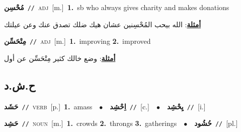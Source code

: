 \documentclass[10pt,a4paper,twoside]{article} %
\begin{document}
\begin{multicols}{2}
{\setlength\topsep{0pt}\textbf{\foreignlanguage{arabic}{مُحْسِن}}\ {\color{gray}\texttt{//}\color{black}}\ \textsc{adj}\ [m.]\ \textbf{1.}~sb who always gives charity and makes donations\  \begin{flushright}\color{gray}\foreignlanguage{arabic}{\textbf{\underline{\foreignlanguage{arabic}{أمثلة}}}: الله بيحب المُحْسِنين عشان هيك ضلك تصدق عنك وعن عيلتك}\end{flushright}\color{black}} \vspace{2mm}

{\setlength\topsep{0pt}\textbf{\foreignlanguage{arabic}{مِتْحَسِّن}}\ {\color{gray}\texttt{//}\color{black}}\ \textsc{adj}\ [m.]\ \textbf{1.}~improving  \textbf{2.}~improved\  \begin{flushright}\color{gray}\foreignlanguage{arabic}{\textbf{\underline{\foreignlanguage{arabic}{أمثلة}}}: وضع خالك كثير مِتْحَسِّن عن أول}\end{flushright}\color{black}} \vspace{2mm}

\vspace{-3mm}
\subsection*{\color{blue}\foreignlanguage{arabic}{ح.ش.د}\color{blue}{}} 

{\setlength\topsep{0pt}\textbf{\foreignlanguage{arabic}{حَشَد}}\ {\color{gray}\texttt{//}\color{black}}\ \textsc{verb}\ [p.]\ \textbf{1.}~amass\ \ $\bullet$\ \ \setlength\topsep{0pt}\textbf{\foreignlanguage{arabic}{اِحْشِد}}\ {\color{gray}\texttt{//}\color{black}}\ [c.]\ \ $\bullet$\ \ \setlength\topsep{0pt}\textbf{\foreignlanguage{arabic}{يِحْشِد}}\ {\color{gray}\texttt{//}\color{black}}\ [i.]\ } \vspace{2mm}

{\setlength\topsep{0pt}\textbf{\foreignlanguage{arabic}{حَشِد}}\ {\color{gray}\texttt{//}\color{black}}\ \textsc{noun}\ [m.]\ \textbf{1.}~crowds  \textbf{2.}~throngs  \textbf{3.}~gatherings\ \ $\bullet$\ \ \setlength\topsep{0pt}\textbf{\foreignlanguage{arabic}{حُشُود}}\ {\color{gray}\texttt{//}\color{black}}\ [pl.]\ } \vspace{2mm}


\end{multicols}
\end{document}
